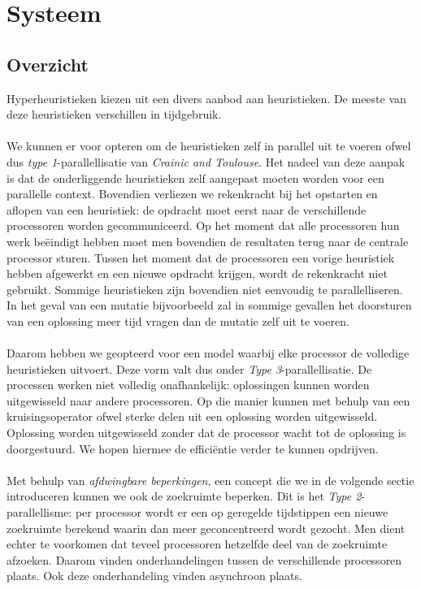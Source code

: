 \section{Systeem}

\subsection{Overzicht}

Hyperheuristieken kiezen uit een divers aanbod aan heuristieken. De meeste van deze heuristieken verschillen in tijdgebruik.

\paragraph{}
We kunnen er voor opteren om de heuristieken zelf in parallel uit te voeren ofwel dus \emph{type 1}-parallellisatie van \emph{Crainic and Toulouse}\cite{crainicAndToulouse}. Het nadeel van deze aanpak is dat de onderliggende heuristieken zelf aangepast moeten worden voor een parallelle context. Bovendien verliezen we rekenkracht bij het opstarten en aflopen van een heuristiek: de opdracht moet eerst naar de verschillende processoren worden gecommuniceerd. Op het moment dat alle processoren hun werk be\"eindigt hebben moet men bovendien de resultaten terug naar de centrale processor sturen. Tussen het moment dat de processoren een vorige heuristiek hebben afgewerkt en een nieuwe opdracht krijgen, wordt de rekenkracht niet gebruikt. Sommige heuristieken zijn bovendien niet eenvoudig te parallelliseren. In het geval van een mutatie bijvoorbeeld zal in sommige gevallen het doorsturen van een oplossing meer tijd vragen dan de mutatie zelf uit te voeren.

\paragraph{}
Daarom hebben we geopteerd voor een model waarbij elke processor de volledige heuristieken uitvoert. Deze vorm valt dus onder \emph{Type 3}-parallellisatie. De processen werken niet volledig onafhankelijk: oplossingen kunnen worden uitgewisseld naar andere processoren. Op die manier kunnen met behulp van een kruisingsoperator ofwel \emph{\abco{}} sterke delen uit een oplossing worden uitgewisseld. Oplossing worden uitgewisseld zonder dat de processor wacht tot de oplossing is doorgestuurd. We hopen hiermee de effici\"entie verder te kunnen opdrijven.

\paragraph{}
Met behulp van \emph{afdwingbare beperkingen}, een concept die we in de volgende sectie introduceren kunnen we ook de zoekruimte beperken. Dit is het \emph{Type 2}-parallellisme: per processor wordt er een op geregelde tijdstippen een nieuwe zoekruimte berekend waarin dan meer geconcentreerd wordt gezocht. Men dient echter te voorkomen dat teveel processoren hetzelfde deel van de zoekruimte afzoeken. Daarom vinden onderhandelingen tussen de verschillende processoren plaats. Ook deze onderhandeling vinden asynchroon plaats.

